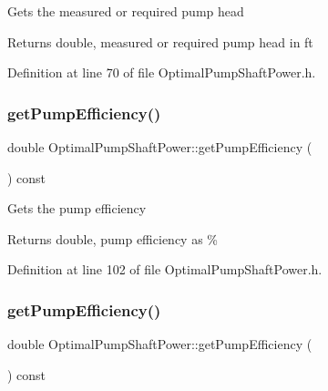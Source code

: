 Gets the measured or required pump head \begin{DoxyReturn}{Returns}
double, measured or required pump head in ft 
\end{DoxyReturn}


Definition at line 70 of file Optimal\+Pump\+Shaft\+Power.\+h.

\mbox{\label{class_optimal_pump_shaft_power_a77b9c639438f9d6008c20948f173a2c4}} 
\subsubsection{\texorpdfstring{get\+Pump\+Efficiency()}{getPumpEfficiency()}\hspace{0.1cm}{\footnotesize\ttfamily [1/3]}}
{\footnotesize\ttfamily double Optimal\+Pump\+Shaft\+Power\+::get\+Pump\+Efficiency (\begin{DoxyParamCaption}{ }\end{DoxyParamCaption}) const\hspace{0.3cm}{\ttfamily [inline]}}

Gets the pump efficiency \begin{DoxyReturn}{Returns}
double, pump efficiency as \% 
\end{DoxyReturn}


Definition at line 102 of file Optimal\+Pump\+Shaft\+Power.\+h.

\mbox{\label{class_optimal_pump_shaft_power_a77b9c639438f9d6008c20948f173a2c4}} 
\subsubsection{\texorpdfstring{get\+Pump\+Efficiency()}{getPumpEfficiency()}\hspace{0.1cm}{\footnotesize\ttfamily [2/3]}}
{\footnotesize\ttfamily double Optimal\+Pump\+Shaft\+Power\+::get\+Pump\+Efficiency (\begin{DoxyParamCaption}{ }\end{DoxyParamCaption}) const\hspace{0.3cm}{\ttfamily [inline]}}

